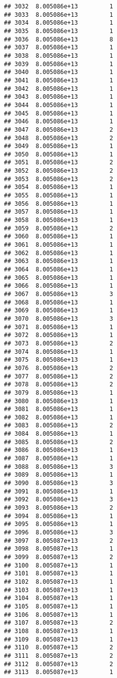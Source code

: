 \documentclass[
]{article}
\begin{document}
\begin{verbatim}
## 3032  8.005086e+13         1
## 3033  8.005086e+13         1
## 3034  8.005086e+13         1
## 3035  8.005086e+13         1
## 3036  8.005086e+13         8
## 3037  8.005086e+13         1
## 3038  8.005086e+13         1
## 3039  8.005086e+13         1
## 3040  8.005086e+13         1
## 3041  8.005086e+13         1
## 3042  8.005086e+13         1
## 3043  8.005086e+13         1
## 3044  8.005086e+13         1
## 3045  8.005086e+13         1
## 3046  8.005086e+13         1
## 3047  8.005086e+13         2
## 3048  8.005086e+13         2
## 3049  8.005086e+13         1
## 3050  8.005086e+13         1
## 3051  8.005086e+13         2
## 3052  8.005086e+13         2
## 3053  8.005086e+13         2
## 3054  8.005086e+13         1
## 3055  8.005086e+13         1
## 3056  8.005086e+13         1
## 3057  8.005086e+13         1
## 3058  8.005086e+13         1
## 3059  8.005086e+13         2
## 3060  8.005086e+13         1
## 3061  8.005086e+13         1
## 3062  8.005086e+13         1
## 3063  8.005086e+13         1
## 3064  8.005086e+13         1
## 3065  8.005086e+13         1
## 3066  8.005086e+13         1
## 3067  8.005086e+13         3
## 3068  8.005086e+13         1
## 3069  8.005086e+13         1
## 3070  8.005086e+13         3
## 3071  8.005086e+13         1
## 3072  8.005086e+13         1
## 3073  8.005086e+13         2
## 3074  8.005086e+13         1
## 3075  8.005086e+13         1
## 3076  8.005086e+13         2
## 3077  8.005086e+13         2
## 3078  8.005086e+13         2
## 3079  8.005086e+13         1
## 3080  8.005086e+13         1
## 3081  8.005086e+13         1
## 3082  8.005086e+13         1
## 3083  8.005086e+13         2
## 3084  8.005086e+13         1
## 3085  8.005086e+13         2
## 3086  8.005086e+13         1
## 3087  8.005086e+13         1
## 3088  8.005086e+13         3
## 3089  8.005086e+13         1
## 3090  8.005086e+13         3
## 3091  8.005086e+13         1
## 3092  8.005086e+13         3
## 3093  8.005086e+13         2
## 3094  8.005086e+13         1
## 3095  8.005086e+13         1
## 3096  8.005086e+13         3
## 3097  8.005087e+13         2
## 3098  8.005087e+13         1
## 3099  8.005087e+13         2
## 3100  8.005087e+13         1
## 3101  8.005087e+13         1
## 3102  8.005087e+13         1
## 3103  8.005087e+13         1
## 3104  8.005087e+13         1
## 3105  8.005087e+13         1
## 3106  8.005087e+13         1
## 3107  8.005087e+13         2
## 3108  8.005087e+13         1
## 3109  8.005087e+13         1
## 3110  8.005087e+13         2
## 3111  8.005087e+13         2
## 3112  8.005087e+13         2
## 3113  8.005087e+13         1

\end{verbatim}
\end{document}
